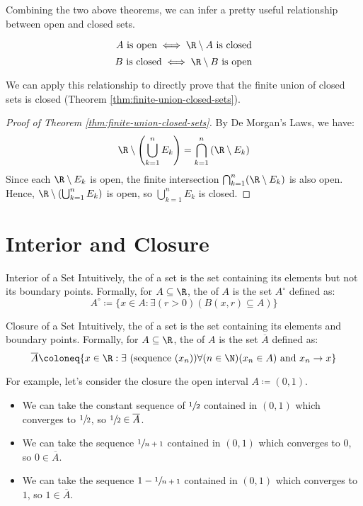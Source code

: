 Combining the two above theorems, we can infer a pretty useful relationship between open and closed sets.

\[ A\ \text{is open} \iff \R \setminus A\ \text{is closed} \]
\[ B\ \text{is closed} \iff \R \setminus B\ \text{is open} \]

We can apply this relationship to directly prove that the finite union of closed sets is closed (Theorem \ref{thm:finite-union-closed-sets}).

\begin{proof}[Proof of Theorem \ref{thm:finite-union-closed-sets}]
    By De Morgan's Laws, we have:
    \[ \R \setminus \left( \bigcup_{k=1}^n E_k \right) = \bigcap_{k=1}^{n} \left( \R \setminus E_k \right) \]
    Since each $\R \setminus E_k$ is open, the finite intersection $\bigcap_{k=1}^n (\R \setminus E_k)$ is also open. Hence, $\R \setminus \left( \bigcup_{k=1}^n E_k \right)$ is open, so $\bigcup_{k=1}^n E_k$ is closed.
\end{proof}

\section{Interior and Closure}
\begin{dfnbox}{Interior of a Set}{}
    Intuitively, the  of a set is the set containing its elements but not its boundary points.
    \tcblower
    Formally, for $A \subseteq \R$, the  of $A$ is the set $A^{\circ}$ defined as:
    \[ A^{\circ} \coloneq \{ x \in A : \exists (r>0)(B(x,r) \subseteq A) \} \]
\end{dfnbox}

\begin{dfnbox}{Closure of a Set}{}
    Intuitively, the  of a set is the set containing its elements and boundary points.
    \tcblower
    Formally, for $A \subseteq \R$, the  of $A$ is the set $\overline{A}$ defined as:
    \[ \overline{A} \coloneq \{ x \in \R : \exists\ (\text{sequence}\ (x_n)) \forall(n \in \N)(x_n \in A)\ \text{and}\ x_n \to x \} \]
\end{dfnbox}

For example, let's consider the closure the open interval $ A \coloneq (0,1)$.
\begin{itemize}
    \item We can take the constant sequence of $\sfrac{1}{2}$ contained in $(0,1)$ which converges to $\sfrac{1}{2}$, so $\sfrac{1}{2} \in \overline{A}$.
    \item We can take the sequence $\sfrac{1}{n+1}$ contained in $(0,1)$ which converges to $0$, so $0 \in \overline{A}$.
    \item We can take the sequence $1 - \sfrac{1}{n+1}$ contained in $(0,1)$ which converges to $1$, so $1 \in \overline{A}$.
\end{itemize}

